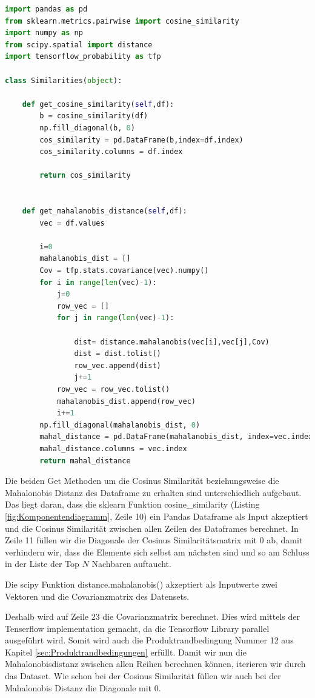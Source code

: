 \begin{lstlisting}[language=Python, caption= Komponente Similarities, label=lst:Similarities]
import pandas as pd
from sklearn.metrics.pairwise import cosine_similarity
import numpy as np
from scipy.spatial import distance
import tensorflow_probability as tfp

class Similarities(object):
    
    def get_cosine_similarity(self,df):
        b = cosine_similarity(df)
        np.fill_diagonal(b, 0)
        cos_similarity = pd.DataFrame(b,index=df.index)
        cos_similarity.columns = df.index

        return cos_similarity
    

    def get_mahalanobis_distance(self,df):
        vec = df.values

        i=0
        mahalanobis_dist = []
        Cov = tfp.stats.covariance(vec).numpy()
        for i in range(len(vec)-1):
            j=0
            row_vec = []
            for j in range(len(vec)-1):

                dist= distance.mahalanobis(vec[i],vec[j],Cov)
                dist = dist.tolist()
                row_vec.append(dist)
                j+=1
            row_vec = row_vec.tolist()
            mahalanobis_dist.append(row_vec)
            i+=1
        np.fill_diagonal(mahalanobis_dist, 0)
        mahal_distance = pd.DataFrame(mahalanobis_dist, index=vec.index)
        mahal_distance.columns = vec.index
        return mahal_distance

\end{lstlisting}

Die beiden Get Methoden um die Cosinus Similarität beziehungsweise die Mahalonobis Distanz des Dataframe zu erhalten sind unterschiedlich aufgebaut. Das liegt daran, dass die sklearn Funktion cosine\_similarity (Listing \ref{fig:Komponentendiagramm}, Zeile 10) ein Pandas Dataframe als Input akzeptiert und die Cosinus Similarität zwischen allen Zeilen des Dataframes berechnet. In Zeile 11 füllen wir die Diagonale der Cosinus Similaritätsmatrix mit 0 ab, damit verhindern wir, dass die Elemente sich selbst am nächsten sind und so am Schluss in der Liste der Top $N$ Nachbaren auftaucht.

Die scipy Funktion distance.mahalanobis() akzeptiert als Inputwerte zwei Vektoren und die Covarianzmatrix des Datensets. 

Deshalb wird auf Zeile 23 die Covarianzmatrix berechnet. Dies wird mittels der Tenserflow implementation gemacht, da die Tensorflow Library parallel ausgeführt wird. Somit wird auch die Produktrandbedingung Nummer 12 aus Kapitel \ref{sec:Produktrandbedingungen} erfüllt. Damit wir nun die Mahalonobisdistanz zwischen allen Reihen berechnen können, iterieren wir durch das Dataset. Wie schon bei der Cosinus Similarität füllen wir auch bei der Mahalonobis Distanz die Diagonale mit 0.

